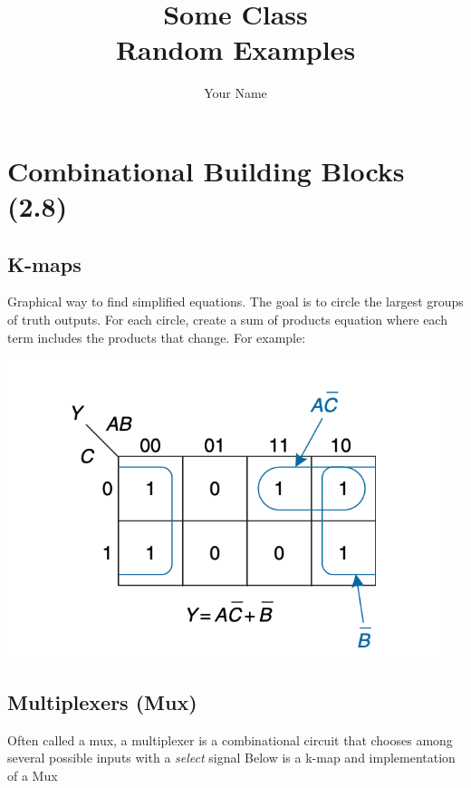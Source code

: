 \documentclass[12pt]{report}
\title{\Huge{Some Class}\\Random Examples}
\author{\huge{Your Name}}
\date{}
\begin{document}
\chapter{Combinational Building Blocks (2.8)}
\section{K-maps}
Graphical way to find simplified equations. The goal is to circle the largest groups of truth outputs.
For each circle, create a sum of products equation where each term includes the products that change. For example:

\includegraphics[width=5in]{K-map.png}


\newpage

\section{Multiplexers (Mux)}

Often called a mux, a multiplexer is a combinational circuit that chooses among several possible inputs with a \textit{select} signal
Below is a k-map and implementation of a Mux
\end{document}
